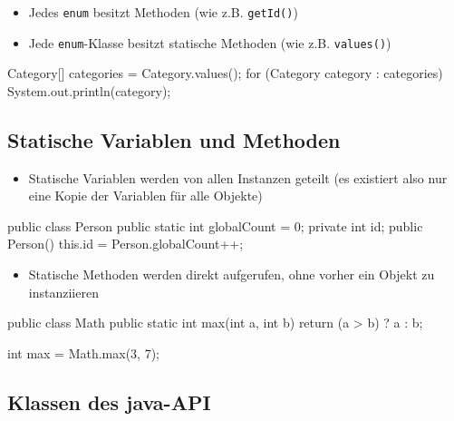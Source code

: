 \documentclass[a4paper,10pt, dvipsnames]{report}
\newcommand{\javaInLine}[1]{\texttt{#1}}
\begin{document}
\begin{itemize}
    \item Jedes \javaInLine{enum} besitzt Methoden (wie z.B. \javaInLine{getId()})
    \item Jede \javaInLine{enum}-Klasse besitzt statische Methoden (wie z.B. \javaInLine{values()})
\end{itemize}

\begin{javacodebox}
    Category[] categories = Category.values();
    for (Category category : categories) {
        System.out.println(category);
    }
\end{javacodebox}


\subsection{Statische Variablen und Methoden}

\begin{itemize}
    \item Statische Variablen werden von allen Instanzen geteilt (es existiert also nur eine Kopie der Variablen für alle Objekte)
\end{itemize}

\begin{javacodebox}
    public class Person {
        public static int globalCount = 0;
        private int id;
        public Person() {
            this.id = Person.globalCount++;
        }
    }
\end{javacodebox}

\begin{itemize}
    \item Statische Methoden werden direkt aufgerufen, ohne vorher ein Objekt zu instanziieren
\end{itemize}

\begin{javacodebox}
    public class Math {
        public static int max(int a, int b) {
            return (a > b) ? a : b;
        }
    }
\end{javacodebox}

\begin{javacodebox}
    int max = Math.max(3, 7);
\end{javacodebox}



\subsection{Klassen des java-API}
\end{document}
